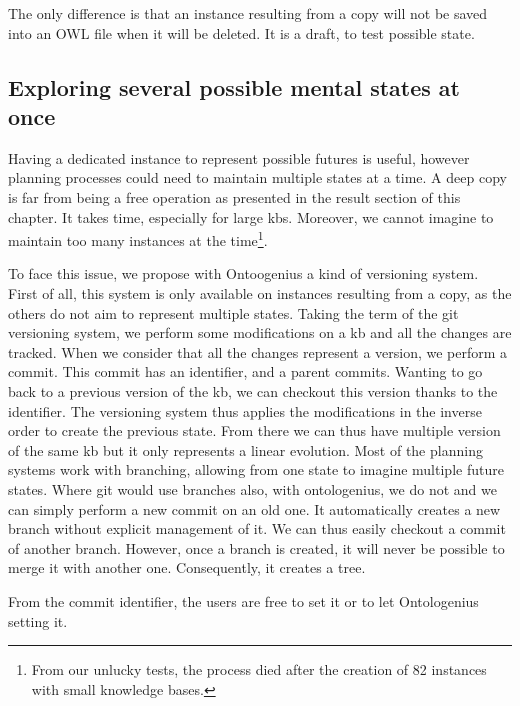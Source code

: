 The only difference is that an instance resulting from a copy will not be saved into an OWL file when it will be deleted. It is a draft, to test possible state.

\subsection{Exploring several possible mental states at once}

Having a dedicated instance to represent possible futures is useful, however planning processes could need to maintain multiple states at a time. A deep copy is far from being a free operation as presented in the result section of this chapter. It takes time, especially for large \acrshort{kb}s. Moreover, we cannot imagine to maintain too many instances at the time\footnote{From our unlucky tests, the process died after the creation of 82 instances with small knowledge bases.}.

To face this issue, we propose with Ontoogenius a kind of versioning system. First of all, this system is only available on instances resulting from a copy, as the others do not aim to represent multiple states. Taking the term of the git versioning system, we perform some modifications on a \acrshort{kb} and all the changes are tracked. When we consider that all the changes represent a version, we perform a commit. This commit has an identifier, and a parent commits. Wanting to go back to a previous version of the \acrshort{kb}, we can checkout this version thanks to the identifier. The versioning system thus applies the modifications in the inverse order to create the previous state. From there we can thus have multiple version of the same \acrshort{kb} but it only represents a linear evolution. Most of the planning systems work with branching, allowing from one state to imagine multiple future states. Where git would use branches also, with ontologenius, we do not and we can simply perform a new commit on an old one. It automatically creates a new branch without explicit management of it. We can thus easily checkout a commit of another branch. However, once a branch is created, it will never be possible to merge it with another one. Consequently, it creates a tree.

From the commit identifier, the users are free to set it or to let Ontologenius setting it.

